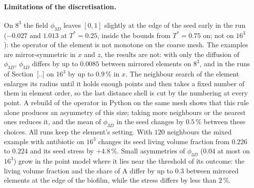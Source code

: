 \paragraph{Limitations of the discretisation.}
On $8^3$ the field $\phi_{3D}$ leaves $[0,1]$ slightly at the edge of the seed early in the run ($-0.027$ and
$1.013$ at $T^*=0.25$, inside the bounds from $T^*=0.75$ on; not on $16^3$): the operator of the element is not
monotone on the coarse mesh. The examples are mirror-symmetric in $x$ and $z$, the results are not: with only
the diffusion of $\phi_{3D}$, $\phi_{3D}$ differs by up to $0.0085$ between mirrored elements on $8^3$, and in
the runs of Section~[..] on $16^3$ by up to $0.9\,\%$ in $x$. The neighbour search of the element enlarges its
radius until it holds enough points and then takes a fixed number of them in element order, so the last
distance shell is cut by the numbering at every point. A rebuild of the operator in Python on the same mesh
shows that this rule alone produces an asymmetry of this size; taking more neighbours or the nearest ones
reduces it, and the mean of $\phi_{3D}$ in the seed changes by $0.5\,\%$ between these choices. All runs keep
the element's setting. With $120$ neighbours the mixed example with antibiotic on $16^3$ changes its seed
living volume fraction from $0.226$ to $0.224$ and its seed stress by $+4.8\,\%$. Small asymmetries of
$\phi_{3D}$ ($0.04$ at most on $16^3$) grow in the point model where it lies near the threshold of its
outcome: the living volume fraction and the share of A differ by up to $0.3$ between mirrored elements at the
edge of the biofilm, while the stress differs by less than $2\,\%$.
